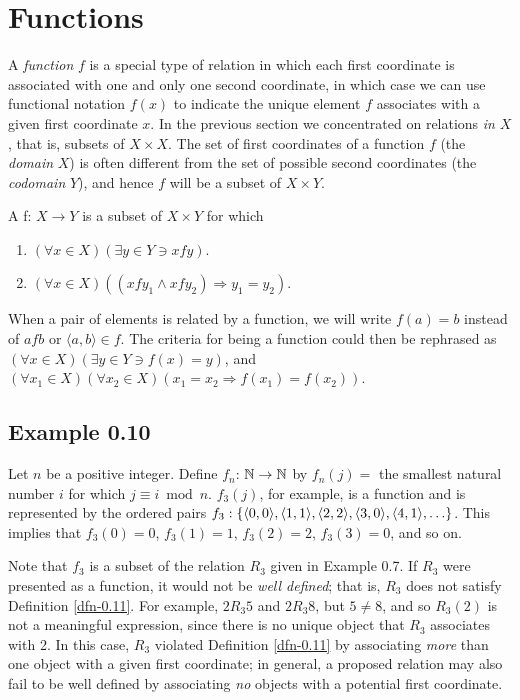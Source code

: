 \section{Functions}\label{sec-0.3}

A \emph{function} $f$ is a special type of relation in which each first
coordinate is associated with one and only one second coordinate, in which case
we can use functional notation $f(x)$ to indicate the unique element $f$
associates with a given first coordinate $x$. In the previous section we
concentrated on relations \emph{in} $X$, that is, subsets of $X \times X$. The
set of first coordinates of a function $f$ (the \emph{domain} $X$) is often
different from the set of possible second coordinates (the \emph{codomain} $Y$),
and hence $f$ will be a subset of $X \times Y$.

\begin{dfn}\label{dfn-0.11}
A \emph{} f: $X \rightarrow Y$ is a subset of $X \times Y$ for
which 
\begin{enumerate}
\item $(\forall x \in X)(\exists y \in Y \ni xfy)$.
\item $(\forall x \in X)((xfy_1 \wedge xfy_2) \Rightarrow y_1 = y_2 )$.
\end{enumerate}
\end{dfn}

When a pair of elements is related by a function, we will write $f(a) = b$
instead of $afb$ or $\langle a,b\rangle\in f$. The criteria for being a function
could then be rephrased as $(\forall x \in X)(\exists y \in Y \ni f(x) = y)$,
and $(\forall x_1 \in X)(\forall x_2 \in X)(x_1 = x_2
\Rightarrow f(x_1) = f(x_2))$.

\subsection*{Example 0.10}

Let $n$ be a positive integer. Define $f_n$: $\mathbb{N} \rightarrow \mathbb{N}$ by $f_{n}(j)
=$ the smallest natural number $i$ for which $j \equiv i \bmod{n}$. $f_3 (j)$,
for example, is a function and is represented by the ordered pairs
$f_3: \{\langle 0, 0\rangle, \langle 1, 1\rangle, \langle 2, 2\rangle,
\langle 3, 0\rangle, \\ \langle 4,1\rangle, \ldots \}$. This implies that
$f_3 (0) = 0$, $f_3 (1) = 1$, $f_3 (2) = 2$, $f_3 (3) = 0$, and so on.

Note that $f_3$ is a subset of the relation $R_3$ given in Example 0.7. If $R_3$
were presented as a function, it would not be \emph{well defined}; that is, $R_3$
does not satisfy Definition \ref{dfn-0.11}. For example, $2 R_3 5$ and $2 R_3 8$, but
$5 \not= 8$, and so $R_3 (2)$ is not a meaningful expression, since there is no
unique object that $R_3$ associates with 2. In this case, $R_3$ violated 
Definition \ref{dfn-0.11} by associating \emph{more} than one object with a
given first coordinate; in general, a proposed relation may also fail to be well
defined by associating \emph{no} objects with a potential first coordinate.

